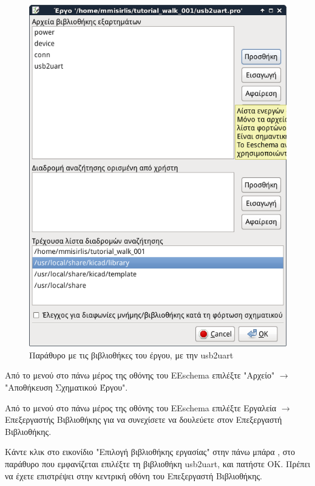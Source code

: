 \documentclass[a4paper]{article}
\begin{document}
\begin{figure}
  \begin{center}
    \includegraphics[width=.9\textwidth]{img/libed-dial-libs.png}
    \caption{Παράθυρο με τις βιβλιοθήκες του έργου, με την usb2uart}
    \label{fig:libed-dial-libs}
  \end{center}
\end{figure}

Από το μενού στο πάνω μέρος της οθόνης του \textenglish{EEschema} επιλέξτε "Αρχείο" $\rightarrow$ "Αποθήκευση Σχηματικού Έργου".

Από το μενού στο πάνω μέρος της οθόνης του \textenglish{EEschema} επιλέξτε Εργαλεία $\rightarrow$ Επεξεργαστής Βιβλιοθήκης για να συνεχίσετε να δουλεύετε στον Επεξεργαστή Βιβλιοθήκης.

Κάντε κλικ στο εικονίδιο "Επιλογή βιβλιοθήκης εργασίας" στην πάνω μπάρα %
, στο παράθυρο που εμφανίζεται επιλέξτε τη βιβλιοθήκη usb2uart, και πατήστε ΟΚ. Πρέπει να έχετε επιστρέψει στην κεντρική οθόνη του Επεξεργαστή Βιβλιοθήκης.

\begin{figure}
  \begin{center}
    \label{fig:kicad-main}
  \end{center}
\end{figure}
\end{document}
